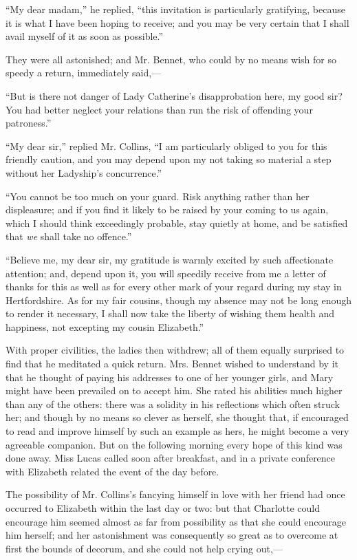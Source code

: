 \documentclass[12pt]{book}
\begin{document}
``My dear madam,'' he replied, ``this invitation is particularly gratifying, because it is what I have been hoping to receive; and you may be very certain that I shall avail myself of it as soon as possible.''

They were all astonished; and Mr. Bennet, who could by no means wish for so speedy a return, immediately said,---

``But is there not danger of Lady Catherine's disapprobation here, my good sir? You had better neglect your relations than run the risk of offending your patroness.''

``My dear sir,'' replied Mr. Collins, ``I am particularly obliged to you for this friendly caution, and you may depend upon my not taking so material a step without her Ladyship's concurrence.''

``You cannot be too much on your guard. Risk anything rather than her displeasure; and if you find it likely to be raised by your coming to us again, which I should think exceedingly probable, stay quietly at home, and be satisfied that \textit{we} shall take no offence.''

``Believe me, my dear sir, my gratitude is warmly excited by such affectionate attention; and, depend upon it, you will speedily receive from me a letter of thanks for this as well as for every other mark of your regard during my stay in Hertfordshire. As for my fair cousins, though my absence may not be long enough to render it necessary, I shall now take the liberty of wishing them health and happiness, not excepting my cousin Elizabeth.''

With proper civilities, the ladies then withdrew; all of them equally surprised to find that he meditated a quick return. Mrs. Bennet wished to understand by it that he thought of paying his addresses to one of her younger girls, and Mary might have been prevailed on to accept him. She rated his abilities much higher than any of the others: there was a solidity in his reflections which often struck her; and though by no means so clever as herself, she thought that, if encouraged to read and improve himself by such an example as hers, he might become a very agreeable companion. But on the following morning every hope of this kind was done away. Miss Lucas called soon after breakfast, and in a private conference with Elizabeth related the event of the day before.

The possibility of Mr. Collins's fancying himself in love with her friend had once occurred to Elizabeth within the last day or two: but that Charlotte could encourage him seemed almost as far from possibility as that she could encourage him herself; and her astonishment was consequently so great as to overcome at first the bounds of decorum, and she could not help crying out,---
\end{document}
